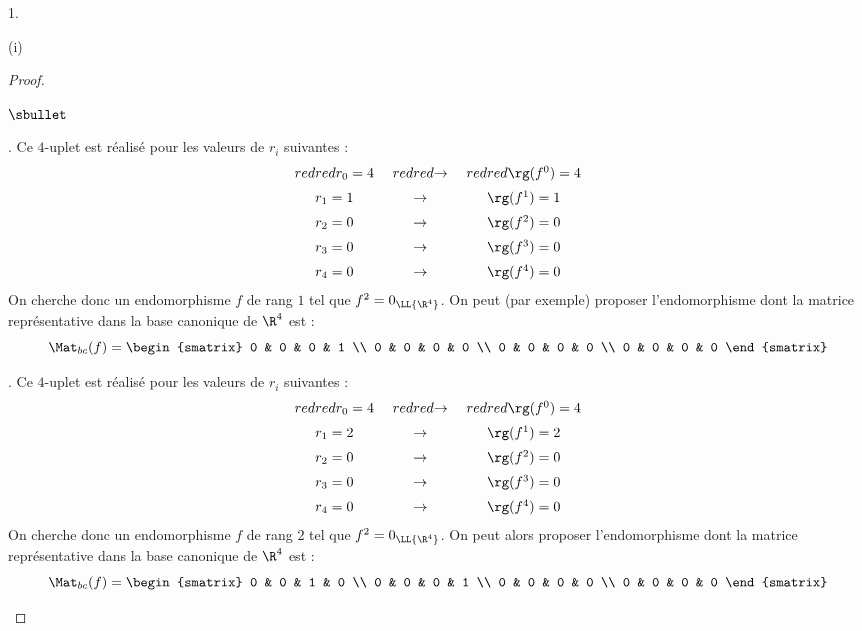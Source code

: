 \documentclass[11pt]{article}%
\begin{document}
\begin{noliste}{1.}
\begin{noliste}{(i)}
\begin{proof}
\begin{noliste}{$\sbullet$}
        \item {}. Ce
          $4$-uplet est réalisé pour les valeurs de $r_i$ suivantes :
          \[
          \begin{array}{c@{\ \quad}c@{\ \quad}c}
            \color{red}{r_0 = 4} & \color{red}{\rightarrow} &
            \color{red}{\rg(f^0) = 4} \\[.2cm] 
            r_1 = 1 & \rightarrow & \rg(f^1) = 1 \\[.2cm]
            r_2 = 0 & \rightarrow & \rg(f^2) = 0 \\[.2cm]
            r_3 = 0 & \rightarrow & \rg(f^3) = 0 \\[.2cm]
            r_4 = 0 & \rightarrow & \rg(f^4) = 0 
          \end{array}
          \]
          On cherche donc un endomorphisme $f$ de rang $1$ tel que
          $f^2 = 0_{\LL{\R^4}}$. On peut (par exemple) proposer
          l'endomorphisme dont la matrice représentative dans la base
          canonique de $\R^4$ est :
          \[
          \Mat_{bc}(f) =
          \begin{smatrix}
            0 & 0 & 0 & 1 \\
            0 & 0 & 0 & 0 \\
            0 & 0 & 0 & 0 \\
            0 & 0 & 0 & 0 
          \end{smatrix}
          \]

        \item {}. Ce
          $4$-uplet est réalisé pour les valeurs de $r_i$ suivantes :
          \[
          \begin{array}{c@{\ \quad}c@{\ \quad}c}
            \color{red}{r_0 = 4} & \color{red}{\rightarrow} &
            \color{red}{\rg(f^0) = 4} \\[.2cm] 
            r_1 = 2 & \rightarrow & \rg(f^1) = 2 \\[.2cm]
            r_2 = 0 & \rightarrow & \rg(f^2) = 0 \\[.2cm]
            r_3 = 0 & \rightarrow & \rg(f^3) = 0 \\[.2cm]
            r_4 = 0 & \rightarrow & \rg(f^4) = 0 
          \end{array}
          \]
          On cherche donc un endomorphisme $f$ de rang $2$ tel que
          $f^2 = 0_{\LL{\R^4}}$. On peut alors proposer
          l'endomorphisme dont la matrice représentative dans la base
          canonique de $\R^4$ est :
          \[
          \Mat_{bc}(f) =
          \begin{smatrix}
            0 & 0 & 1 & 0 \\
            0 & 0 & 0 & 1 \\
            0 & 0 & 0 & 0 \\
            0 & 0 & 0 & 0 
          \end{smatrix}
          \]



\end{noliste}
\end{proof}
\end{noliste}
\end{noliste}
\end{document}
